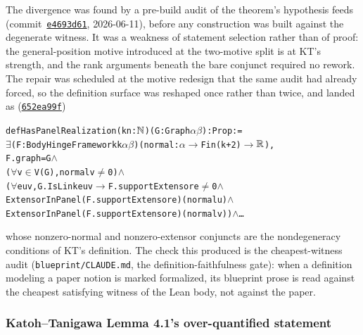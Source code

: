 The divergence was found by a pre-build audit of the theorem's
hypothesis feeds
(commit~\href{https://github.com/bryangingechen/CombinatorialRigidity/commit/e4693d6170908c480e4f06924f2ea0a95ce9ba3f}{\texttt{e4693d61}},
2026-06-11), before any construction was built against the degenerate
witness. It was a weakness of statement selection rather than of proof:
the general-position motive introduced at the two-motive split is at
KT's strength, and the rank arguments beneath the bare conjunct
required no rework. The repair was scheduled at the motive redesign
that the same audit had already forced, so the definition surface was
reshaped once rather than twice, and landed as
(\href{https://github.com/bryangingechen/CombinatorialRigidity/commit/652ea99ffe115bd932f7b9da3324473cd8001d0f}{\texttt{652ea99f}})
\begin{alltt}
def HasPanelRealization (k n : \(\N\)) (G : Graph \(\alpha\) \(\beta\)) : Prop :=
  \(\exists\) (F : BodyHingeFramework k \(\alpha\) \(\beta\)) (normal : \(\alpha\) \(\to\) Fin (k + 2) \(\to\) \(\R\)),
    F.graph = G \(\wedge\)
    (\(\forall\) v \(\in\) V(G), normal v \(\neq\) 0) \(\wedge\)
    (\(\forall\) e u v, G.IsLink e u v \(\to\) F.supportExtensor e \(\neq\) 0 \(\wedge\)
      ExtensorInPanel (F.supportExtensor e) (normal u) \(\wedge\)
      ExtensorInPanel (F.supportExtensor e) (normal v)) \(\wedge\) \dots
\end{alltt}
whose nonzero-normal and nonzero-extensor conjuncts are the
nondegeneracy conditions of KT's definition. The check this produced is
the cheapest-witness audit (\texttt{blueprint/CLAUDE.md}, the
definition-faithfulness gate): when a definition modeling a paper
notion is marked formalized, its blueprint prose is read against the
cheapest satisfying witness of the Lean body, not against the paper.

\subsubsection{Katoh--Tanigawa Lemma 4.1's over-quantified statement}

